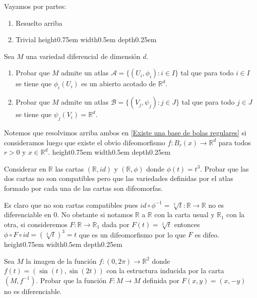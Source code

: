 \documentclass[11pt]{article}
\newcommand{\R}{{\mathbb{R}}}
\numberwithin{theorem}{subsection}
\newcommand{\qed}{\nobreak \ifvmode \relax \else
	\ifdim\lastskip<1.5em \hskip-\lastskip
	\hskip1.5em plus0em minus0.5em \fi \nobreak
	\vrule height0.75em width0.5em depth0.25em\fi}
\begin{document}
\begin{solution}
	Vayamos por partes:
	
	\begin{enumerate}
		\item Resuelto arriba
		\item Trivial \qed
	\end{enumerate}
	
\end{solution}

\begin{question}
	Sea $M$ una variedad diferencial de dimensi\'on $d$.
	\begin{enumerate}
		\item Probar que $M$ admite un atlas $\mathscr{A}=\{(U_i,\phi_i):i\in I\}$ tal que para todo $i\in I$ se tiene que $\phi_i(U_i)$ es un abierto acotado de $\R^d$.
		\item Probar que $M$ admite un atlas $\mathscr{B}=\{(V_j,\psi_j):j\in J\}$ tal que para todo $j\in J$ se tiene que $\psi_j(V_i)=\R^d$.
	\end{enumerate}
\end{question}

\begin{solution}
	Notemos que resolvimos arriba ambos en \ref{Existe una base de bolas regulares} si consideramos luego que existe el obvio difeomorfismo $f : B_r(x) \rightarrow \R^d$ para todos $r> 0 $ y $x \in \R^d$. \qed
\end{solution}

\begin{question}
	Considerar en $\R$ las cartas $(\R,id)$ y $(\R,\phi)$ donde $\phi(t)=t^3$. Probar que las dos cartas no son compatibles pero que las variedades definidas por el atlas formado por cada una de las cartas son difeomorfas.
\end{question}

\begin{solution}
	Es claro que no son cartas compatibles pues $id \circ \phi^{-1} = \sqrt[3]{t} : \R \rightarrow \R$ no es diferenciable en $0$. No obstante si notamos $\R$ a $\R$ con la carta usual y $\R_1$ con la otra, si consideremos $F : \R \rightarrow \R_1$ dada por $F(t) = \sqrt[3]{t}$ entonces $\phi \circ F \circ id = \left(\sqrt[3]{t}\right)^3 = t$ que es un difeomorfismo por lo que $F$ es difeo. \qed
\end{solution}

\begin{question}
	Sea $M$ la imagen de la funci\'on $f:(0,2\pi)\to\R^2$ donde $f(t)=(\sin(t),\sin(2t))$ con la estructura inducida por la carta $(M,f^{-1})$. Probar que la funci\'on $F:M\to M$ definida por $F(x,y)=(x,-y)$ no es diferenciable.
	
\end{question}
\end{document}
